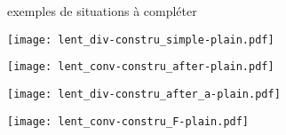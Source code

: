 \documentclass[../main/main.tex]{subfiles}
\begin{document}
\begin{impo}[label=impo:cons_exem]{exemples de situations à compléter}
    \begin{minipage}{0.50\linewidth}
        \begin{center}
            \texttt{[image: lent\_div-constru\_simple-plain.pdf]}
            \label{fig:divconstrusimple}
        \end{center}
    \end{minipage}
    \hfill
    \begin{minipage}{0.50\linewidth}
        \begin{center}
            \texttt{[image: lent\_conv-constru\_after-plain.pdf]}
            \label{fig:convconstruafter}
        \end{center}
    \end{minipage}
    \begin{minipage}{0.50\linewidth}
        \begin{center}
            \texttt{[image: lent\_div-constru\_after\_a-plain.pdf]}
            \label{fig:divconstruafter}
        \end{center}
    \end{minipage}
    \hfill
    \begin{minipage}{0.50\linewidth}
        \begin{center}
            \texttt{[image: lent\_conv-constru\_F-plain.pdf]}
            \label{fig:convconstruF}
        \end{center}
    \end{minipage}
\end{impo}
\end{document}

